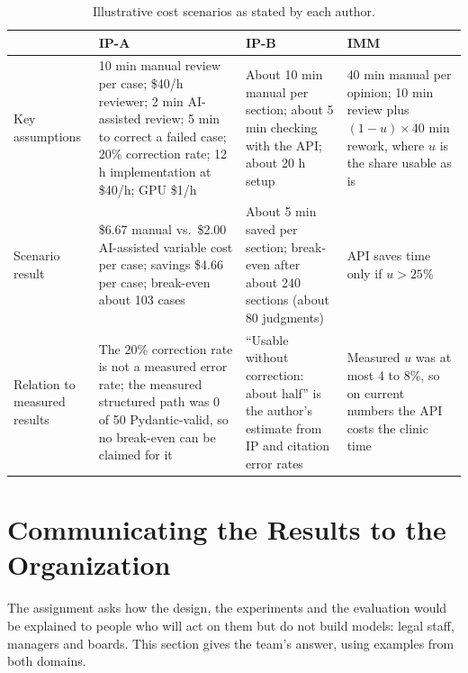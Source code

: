 \documentclass[10pt,letterpaper]{article}
\begin{document}
\begin{table}[ht]
\centering\footnotesize
\caption{Illustrative cost scenarios as stated by each author.}\label{tab:cost}
\begin{tabularx}{\textwidth}{@{}p{2.3cm}LLL@{}}
\toprule
 & \textbf{IP-A} & \textbf{IP-B} & \textbf{IMM}\\
\midrule
Key assumptions & 10 min manual review per case; \$40/h reviewer; 2 min AI-assisted review; 5 min to correct a failed case; 20\% correction rate; 12 h implementation at \$40/h; GPU \$1/h & About 10 min manual per section; about 5 min checking with the API; about 20 h setup & 40 min manual per opinion; 10 min review plus $(1-u)\times 40$ min rework, where $u$ is the share usable as is\\
Scenario result & \$6.67 manual vs.\ \$2.00 AI-assisted variable cost per case; savings \$4.66 per case; break-even about 103 cases & About 5 min saved per section; break-even after about 240 sections (about 80 judgments) & API saves time only if $u > 25\%$\\
Relation to measured results & The 20\% correction rate is not a measured error rate; the measured structured path was 0 of 50 Pydantic-valid, so no break-even can be claimed for it & ``Usable without correction: about half'' is the author's estimate from IP and citation error rates & Measured $u$ was at most 4 to 8\%, so on current numbers the API costs the clinic time\\
\bottomrule
\end{tabularx}
\end{table}

\section{Communicating the Results to the Organization}\label{sec:comm}
The assignment asks how the design, the experiments and the evaluation would be explained to people who will act on them but do not build models: legal staff, managers and boards. This section gives the team's answer, using examples from both domains.
\end{document}
